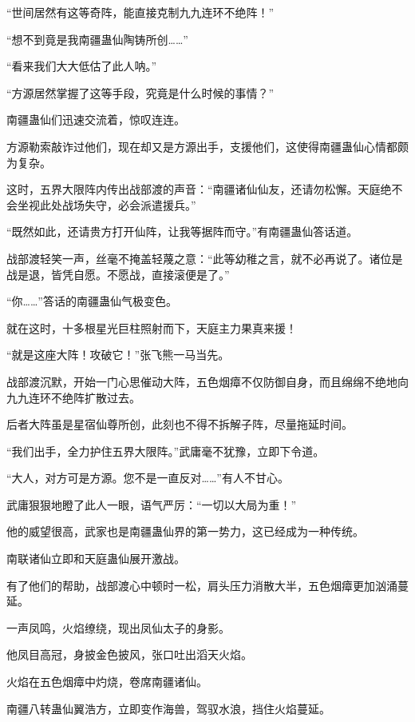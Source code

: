 
\begin{this_body}



“世间居然有这等奇阵，能直接克制九九连环不绝阵！”

“想不到竟是我南疆蛊仙陶铸所创……”

“看来我们大大低估了此人呐。”

“方源居然掌握了这等手段，究竟是什么时候的事情？”

南疆蛊仙们迅速交流着，惊叹连连。

方源勒索敲诈过他们，现在却又是方源出手，支援他们，这使得南疆蛊仙心情都颇为复杂。

这时，五界大限阵内传出战部渡的声音：“南疆诸仙仙友，还请勿松懈。天庭绝不会坐视此处战场失守，必会派遣援兵。”

“既然如此，还请贵方打开仙阵，让我等据阵而守。”有南疆蛊仙答话道。

战部渡轻笑一声，丝毫不掩盖轻蔑之意：“此等幼稚之言，就不必再说了。诸位是战是退，皆凭自愿。不愿战，直接滚便是了。”

“你……”答话的南疆蛊仙气极变色。

就在这时，十多根星光巨柱照射而下，天庭主力果真来援！

“就是这座大阵！攻破它！”张飞熊一马当先。

战部渡沉默，开始一门心思催动大阵，五色烟瘴不仅防御自身，而且绵绵不绝地向九九连环不绝阵扩散过去。

后者大阵虽是星宿仙尊所创，此刻也不得不拆解子阵，尽量拖延时间。

“我们出手，全力护住五界大限阵。”武庸毫不犹豫，立即下令道。

“大人，对方可是方源。您不是一直反对……”有人不甘心。

武庸狠狠地瞪了此人一眼，语气严厉：“一切以大局为重！”

他的威望很高，武家也是南疆蛊仙界的第一势力，这已经成为一种传统。

南联诸仙立即和天庭蛊仙展开激战。

有了他们的帮助，战部渡心中顿时一松，肩头压力消散大半，五色烟瘴更加汹涌蔓延。

一声凤鸣，火焰缭绕，现出凤仙太子的身影。

他凤目高冠，身披金色披风，张口吐出滔天火焰。

火焰在五色烟瘴中灼烧，卷席南疆诸仙。

南疆八转蛊仙翼浩方，立即变作海兽，驾驭水浪，挡住火焰蔓延。


\end{this_body}
